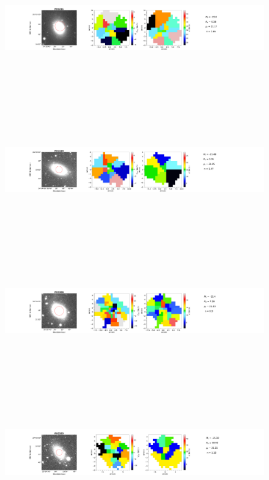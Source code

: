 \documentclass{aa}
\begin{document}
\begin{figure}[!htb]
   \ContinuedFloat
   \centering
   \includegraphics[width=21cm,height=6cm,keepaspectratio]{../2_pipeline/1_V&S_Maps/211Velocity_map.pdf}
   \includegraphics[width=21cm,height=6cm,keepaspectratio]{../2_pipeline/1_V&S_Maps/164Velocity_map.pdf}
   \includegraphics[width=21cm,height=6cm,keepaspectratio]{../2_pipeline/1_V&S_Maps/306Velocity_map.pdf}
   \includegraphics[width=21cm,height=6cm,keepaspectratio]{../2_pipeline/1_V&S_Maps/253Velocity_map.pdf}

\end{figure}
\end{document}
